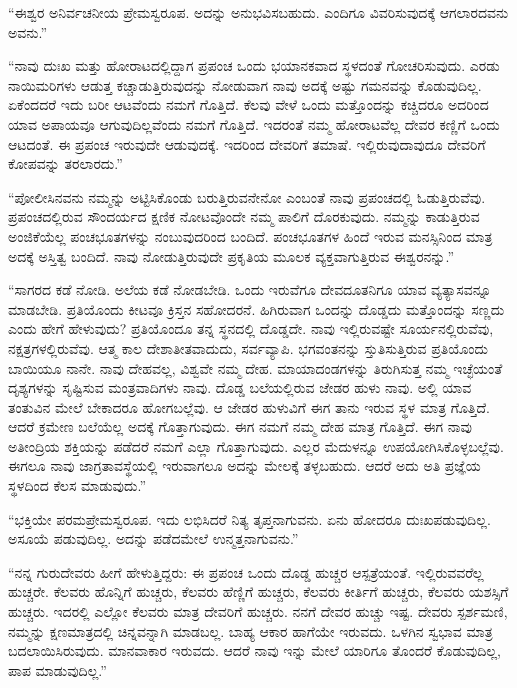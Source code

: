  “ಈಶ್ವರ ಅನಿರ್ವಚನೀಯ ಪ್ರೇಮಸ್ವರೂಪ. ಅದನ್ನು ಅನುಭವಿಸಬಹುದು. ಎಂದಿಗೂ ವಿವರಿಸುವುದಕ್ಕೆ ಆಗಲಾರದವನು ಅವನು.” 

 “ನಾವು ದುಃಖ ಮತ್ತು ಹೋರಾಟದಲ್ಲಿದ್ದಾಗ ಪ್ರಪಂಚ ಒಂದು ಭಯಾನಕವಾದ ಸ್ಥಳದಂತೆ ಗೋಚರಿಸುವುದು. ಎರಡು ನಾಯಿಮರಿಗಳು ಆಡುತ್ತ ಕಚ್ಚಾಡುತ್ತಿರುವುದನ್ನು ನೋಡುವಾಗ ನಾವು ಅದಕ್ಕೆ ಅಷ್ಟು ಗಮನವನ್ನು ಕೊಡುವುದಿಲ್ಲ. ಏಕೆಂದದರೆ ಇದು ಬರೀ ಆಟವೆಂದು ನಮಗೆ ಗೊತ್ತಿದೆ. ಕೆಲವು ವೇಳೆ ಒಂದು ಮತ್ತೊಂದನ್ನು ಕಚ್ಚಿದರೂ ಅದರಿಂದ ಯಾವ ಅಪಾಯವೂ ಆಗುವುದಿಲ್ಲವೆಂದು ನಮಗೆ ಗೊತ್ತಿದೆ. ಇದರಂತೆ ನಮ್ಮ ಹೋರಾಟವೆಲ್ಲ ದೇವರ ಕಣ್ಣಿಗೆ ಒಂದು ಆಟದಂತೆ. ಈ ಪ್ರಪಂಚ ಇರುವುದೇ ಆಡುವುದಕ್ಕೆ. ಇದರಿಂದ ದೇವರಿಗೆ ತಮಾಷೆ. ಇಲ್ಲಿರುವುದಾವುದೂ ದೇವರಿಗೆ ಕೋಪವನ್ನು ತರಲಾರದು.” 

 “ಪೋಲೀಸಿನವನು ನಮ್ಮನ್ನು ಅಟ್ಟಿಸಿಕೊಂಡು ಬರುತ್ತಿರುವನೇನೋ ಎಂಬಂತೆ ನಾವು ಪ್ರಪಂಚದಲ್ಲಿ ಓಡುತ್ತಿರುವೆವು. ಪ್ರಪಂಚದಲ್ಲಿರುವ ಸೌಂದರ್ಯದ ಕ್ಷಣಿಕ ನೋಟವೊಂದೇ ನಮ್ಮ ಪಾಲಿಗೆ ದೊರಕುವುದು. ನಮ್ಮನ್ನು ಕಾಡುತ್ತಿರುವ ಅಂಜಿಕೆಯೆಲ್ಲ ಪಂಚಭೂತಗಳನ್ನು ನಂಬುವುದರಿಂದ ಬಂದಿದೆ. ಪಂಚಭೂತಗಳ ಹಿಂದೆ ಇರುವ ಮನಸ್ಸಿನಿಂದ ಮಾತ್ರ ಅದಕ್ಕೆ ಅಸ್ತಿತ್ವ ಬಂದಿದೆ. ನಾವು ನೋಡುತ್ತಿರುವುದೇ ಪ್ರಕೃತಿಯ ಮೂಲಕ ವ್ಯಕ್ತವಾಗುತ್ತಿರುವ ಈಶ್ವರನನ್ನು.” 

 “ಸಾಗರದ ಕಡೆ ನೋಡಿ. ಅಲೆಯ ಕಡೆ ನೋಡಬೇಡಿ. ಒಂದು ಇರುವೆಗೂ ದೇವದೂತನಿಗೂ ಯಾವ ವ್ಯತ್ಯಾಸವನ್ನೂ ಮಾಡಬೇಡಿ. ಪ್ರತಿಯೊಂದು ಕೀಟವೂ ಕ್ರಿಸ್ತನ ಸಹೋದರನೆ. ಹಿಗಿರುವಾಗ ಒಂದನ್ನು ದೊಡ್ಡದು ಮತ್ತೊಂದನ್ನು ಸಣ್ಣದು ಎಂದು ಹೇಗೆ ಹೇಳುವುದು? ಪ್ರತಿಯೊಂದೂ ತನ್ನ ಸ್ಥನದಲ್ಲಿ ದೊಡ್ಡದೇ. ನಾವು ಇಲ್ಲಿರುವಷ್ಟೇ ಸೂರ್ಯನಲ್ಲಿರುವೆವು, ನಕ್ಷತ್ರಗಳಲ್ಲಿರುವೆವು. ಆತ್ಮ ಕಾಲ ದೇಶಾತೀತವಾದುದು, ಸರ್ವವ್ಯಾಪಿ. ಭಗವಂತನನ್ನು ಸ್ತುತಿಸುತ್ತಿರುವ ಪ್ರತಿಯೊಂದು ಬಾಯಿಯೂ ನಾನೇ. ನಾವು ದೇಹವಲ್ಲ, ವಿಶ್ವವೇ ನಮ್ಮ ದೇಹ. ಮಾಯಾದಂಡಗಳನ್ನು ತಿರುಗಿಸುತ್ತ ನಮ್ಮ ಇಚ್ಛೆಯಂತೆ ದೃಶ್ಯಗಳನ್ನು ಸೃಷ್ಟಿಸುವ ಮಂತ್ರವಾದಿಗಳು ನಾವು. ದೊಡ್ಡ ಬಲೆಯಲ್ಲಿರುವ ಜೇಡರ ಹುಳು ನಾವು. ಅಲ್ಲಿ ಯಾವ ತಂತುವಿನ ಮೇಲೆ ಬೇಕಾದರೂ ಹೋಗಬಲ್ಲೆವು. ಆ ಜೇಡರ ಹುಳುವಿಗೆ ಈಗ ತಾನು ಇರುವ ಸ್ಥಳ ಮಾತ್ರ ಗೊತ್ತಿದೆ. ಆದರೆ ಕ್ರಮೇಣ ಬಲೆಯೆಲ್ಲ ಅದಕ್ಕೆ ಗೊತ್ತಾಗುವುದು. ಈಗ ನಮಗೆ ನಮ್ಮ ದೇಹ ಮಾತ್ರ ಗೊತ್ತಿದೆ. ಈಗ ನಾವು ಅತೀಂದ್ರಿಯ ಶಕ್ತಿಯನ್ನು ಪಡೆದರೆ ನಮಗೆ ಎಲ್ಲಾ ಗೊತ್ತಾಗುವುದು. ಎಲ್ಲರ ಮೆದುಳನ್ನೂ ಉಪಯೋಗಿಸಿಕೊಳ್ಳಬಲ್ಲೆವು. ಈಗಲೂ ನಾವು ಜಾಗ್ರತಾವಸ್ಥೆಯಲ್ಲಿ ಇರುವಾಗಲೂ ಅದನ್ನು ಮೇಲಕ್ಕೆ ತಳ್ಳಬಹುದು. ಆದರೆ ಅದು ಅತಿ ಪ್ರಜ್ಞೆಯ ಸ್ಥಳದಿಂದ ಕೆಲಸ ಮಾಡುವುದು.” 

 “ಭಕ್ತಿಯೇ ಪರಮಪ್ರೇಮಸ್ವರೂಪ. ಇದು ಲಭಿಸಿದರೆ ನಿತ್ಯ ತೃಪ್ತನಾಗುವನು. ಏನು ಹೋದರೂ ದುಃಖಪಡುವುದಿಲ್ಲ. ಅಸೂಯೆ ಪಡುವುದಿಲ್ಲ. ಅದನ್ನು ಪಡೆದಮೇಲೆ ಉನ್ಮತ್ತನಾಗುವನು.” 

 “ನನ್ನ ಗುರುದೇವರು ಹೀಗೆ ಹೇಳುತ್ತಿದ್ದರು: ಈ ಪ್ರಪಂಚ ಒಂದು ದೊಡ್ಡ ಹುಚ್ಚರ ಆಸ್ಪತ್ರೆಯಂತೆ. ಇಲ್ಲಿರುವವರೆಲ್ಲ ಹುಚ್ಚರೇ. ಕೆಲವರು ಹೊನ್ನಿಗೆ ಹುಚ್ಚರು, ಕೆಲವರು ಹೆಣ್ಣಿಗೆ ಹುಚ್ಚರು, ಕೆಲವರು ಕೀರ್ತಿಗೆ ಹುಚ್ಚರು, ಕೆಲವರು ಯಶಸ್ಸಿಗೆ ಹುಚ್ಚರು. ಇದರಲ್ಲಿ ಎಲ್ಲೋ ಕೆಲವರು ಮಾತ್ರ ದೇವರಿಗೆ ಹುಚ್ಚರು. ನನಗೆ ದೇವರ ಹುಚ್ಚು ಇಷ್ಟ. ದೇವರು ಸ್ಪರ್ಶಮಣಿ, ನಮ್ಮನ್ನು ಕ್ಷಣಮಾತ್ರದಲ್ಲಿ ಚಿನ್ನವನ್ನಾಗಿ ಮಾಡಬಲ್ಲ. ಬಾಹ್ಯ ಆಕಾರ ಹಾಗೆಯೇ ಇರುವದು. ಒಳಗಿನ ಸ್ವಭಾವ ಮಾತ್ರ ಬದಲಾಯಿಸಿರುವುದು. ಮಾನವಾಕಾರ ಇರುವದು. ಆದರೆ ನಾವು ಇನ್ನು ಮೇಲೆ ಯಾರಿಗೂ ತೊಂದರೆ ಕೊಡುವುದಿಲ್ಲ, ಪಾಪ ಮಾಡುವುದಿಲ್ಲ.” 

